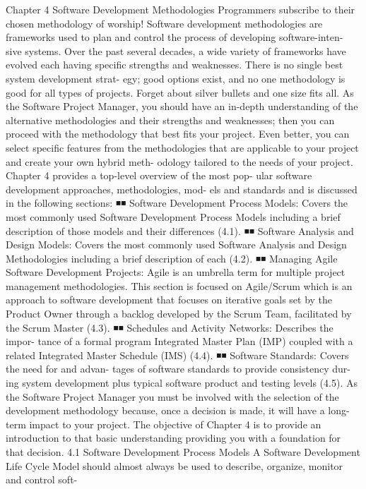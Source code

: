 \documentclass[a4paper,12pt]{book}
\begin{document}
	
Chapter 4
Software Development Methodologies
Programmers subscribe to their chosen methodology
of worship!
Software development methodologies are frameworks used
to plan and control the process of developing software-inten-
sive systems. Over the past several decades, a wide variety of
frameworks have evolved each having specific strengths and
weaknesses. There is no single best system development strat-
egy; good options exist, and no one methodology is good for
all types of projects. Forget about silver bullets and one size
fits all.
As the Software Project Manager, you should have an
in-depth understanding of the alternative methodologies and
their strengths and weaknesses; then you can proceed with
the methodology that best fits your project. Even better, you
can select specific features from the methodologies that are
applicable to your project and create your own hybrid meth-
odology tailored to the needs of your project.
Chapter 4 provides a top-level overview of the most pop-
ular software development approaches, methodologies, mod-
els and standards and is discussed in the following sections:
◾◾ Software Development Process Models: Covers the
most commonly used Software Development Process
Models including a brief description of those models
and their differences (4.1).
◾◾ Software Analysis and Design Models: Covers the
most commonly used Software Analysis and Design
Methodologies including a brief description of each
(4.2).
◾◾ Managing Agile Software Development Projects: Agile
is an umbrella term for multiple project management
methodologies. This section is focused on Agile/Scrum
which is an approach to software development that
focuses on iterative goals set by the Product Owner
through a backlog developed by the Scrum Team,
facilitated by the Scrum Master (4.3).
◾◾ Schedules and Activity Networks: Describes the impor-
tance of a formal program Integrated Master Plan
(IMP) coupled with a related Integrated Master Schedule
(IMS) (4.4).
◾◾ Software Standards: Covers the need for and advan-
tages of software standards to provide consistency dur-
ing system development plus typical software product
and testing levels (4.5).
As the Software Project Manager you must be involved
with the selection of the development methodology because,
once a decision is made, it will have a long-term impact to
your project. The objective of Chapter 4 is to provide an
introduction to that basic understanding providing you with
a foundation for that decision.
4.1 Software Development
Process Models
A Software Development Life Cycle Model should almost
always be used to describe, organize, monitor and control soft-
\end{document}
